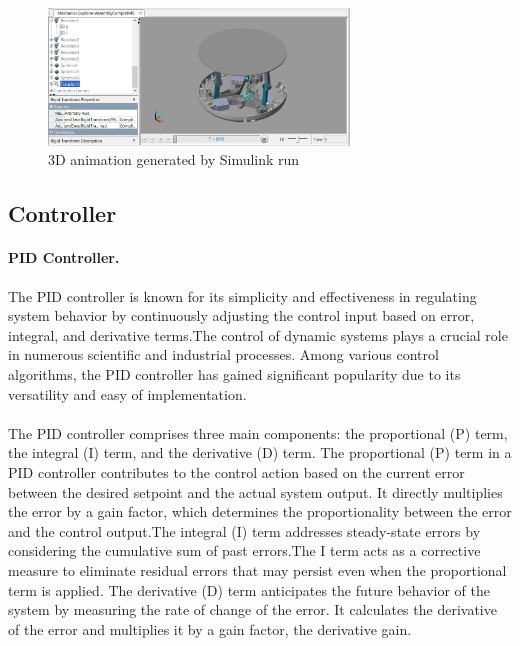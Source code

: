 \begin{center}
    \begin{figure}[ht!]
        \centering
        \includegraphics[width=8cm, keepaspectratio]{imports/ballandplateMatlab.jpg}
        \caption{3D animation generated by Simulink run}
        \label{3D animation generated by Simulink run}
    \end{figure}
\end{center}
  

    

\subsection{Controller}\label{Controller Materials}
\paragraph{PID Controller.}
 The PID controller is known for its simplicity and effectiveness in regulating system behavior by continuously adjusting the control input based on error, integral, and derivative terms.The control of dynamic systems plays a crucial role in numerous scientific and industrial processes. Among various control algorithms, the PID controller has gained significant popularity due to its versatility and easy of implementation. 
\\ \\
 The PID controller comprises three main components: the proportional (P) term, the integral (I) term, and the derivative (D) term. The proportional (P) term in a PID controller contributes to the control action based on the current error between the desired setpoint and the actual system output. It directly multiplies the error by a gain factor, which determines the proportionality between the error and the control output.The integral (I) term addresses steady-state errors by considering the cumulative sum of past errors.The I term acts as a corrective measure to eliminate residual errors that may persist even when the proportional term is applied. The derivative (D) term anticipates the future behavior of the system by measuring the rate of change of the error. It calculates the derivative of the error and multiplies it by a gain factor, the derivative gain.
\\

